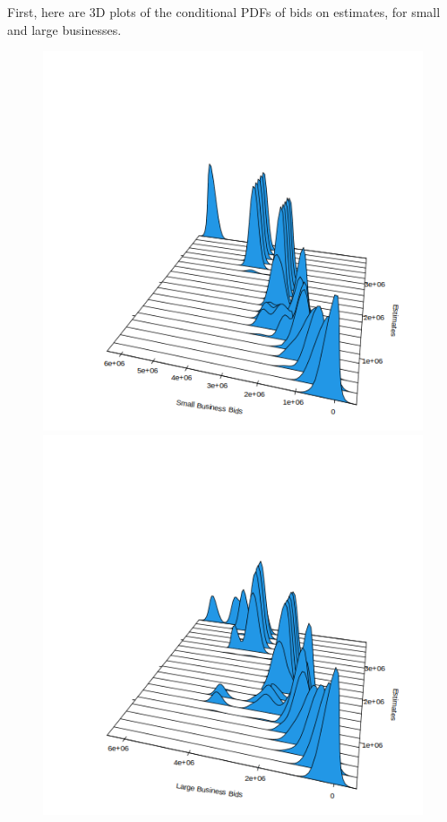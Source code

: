 First, here are 3D plots of the conditional PDFs of bids on estimates, for
small and large businesses.
\begin{figure}[ht!]
\includegraphics[scale=0.5]{imgs/g_s_cond.png}
\includegraphics[scale=0.5]{imgs/g_l_cond.png}
\end{figure}

